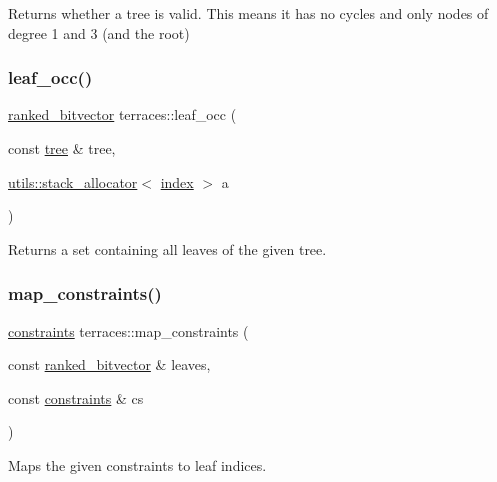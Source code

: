 Returns whether a tree is valid. This means it has no cycles and only nodes of degree 1 and 3 (and the root) \mbox{\label{namespaceterraces_af8d2516221093e7c6f54648e7b2d01bd}} 
\subsubsection{\texorpdfstring{leaf\+\_\+occ()}{leaf\_occ()}}
{\footnotesize\ttfamily \hyperlink{namespaceterraces_acc45ec9c561024c50ecbce5b6738ba08}{ranked\+\_\+bitvector} terraces\+::leaf\+\_\+occ (\begin{DoxyParamCaption}\item[{const \hyperlink{namespaceterraces_a07aaf7feec4a22c6cdefc14c5a81bdd0}{tree} \&}]{tree,  }\item[{\hyperlink{classterraces_1_1utils_1_1stack__allocator}{utils\+::stack\+\_\+allocator}$<$ \hyperlink{namespaceterraces_adbc33ccb543d1634e96d0eb02e472c77}{index} $>$}]{a }\end{DoxyParamCaption})}

Returns a set containing all leaves of the given tree. \mbox{\label{namespaceterraces_a13ef284e706bc528df3f04d49e7be607}} 
\subsubsection{\texorpdfstring{map\+\_\+constraints()}{map\_constraints()}}
{\footnotesize\ttfamily \hyperlink{namespaceterraces_a6f603ffd30ed4d902fce6424492e0581}{constraints} terraces\+::map\+\_\+constraints (\begin{DoxyParamCaption}\item[{const \hyperlink{namespaceterraces_acc45ec9c561024c50ecbce5b6738ba08}{ranked\+\_\+bitvector} \&}]{leaves,  }\item[{const \hyperlink{namespaceterraces_a6f603ffd30ed4d902fce6424492e0581}{constraints} \&}]{cs }\end{DoxyParamCaption})}

Maps the given constraints to leaf indices. \mbox{\label{namespaceterraces_afe895c6224b473a8ac42ee20a43b60dc}} 
